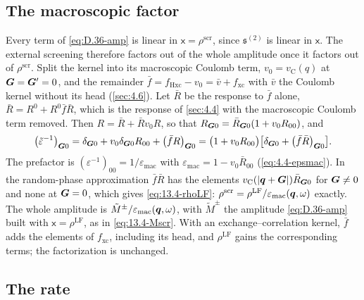 \subsection*{The macroscopic factor}

Every term of \cref{eq:D.36-amp} is linear in $\mathsf{x} = \rho^{\mathrm{scr}}$, since $\mathfrak{s}^{(2)}$ is linear in $\mathsf{x}$. The external screening therefore factors out of the whole amplitude once it factors out of $\rho^{\mathrm{scr}}$. Split the kernel into its macroscopic Coulomb term, $v_0 = v_{\mathrm{C}}(q)$ at $\bm{G} = \bm{G}' = 0$, and the remainder $\bar f = f_{\mathrm{Hxc}} - v_0 = \bar v + f_{\mathrm{xc}}$ with $\bar v$ the Coulomb kernel without its head (\cref{sec:4.6}). Let $\bar R$ be the response to $\bar f$ alone, $\bar R = R^0 + R^0\bar f\bar R$, which is the response of \cref{sec:4.4} with the macroscopic Coulomb term removed. Then $R = \bar R + \bar Rv_0R$, so that $R_{\bm{G}0} = \bar R_{\bm{G}0}(1 + v_0R_{00})$, and
\begin{equation*}
  \bigl(\tilde\varepsilon^{-1}\bigr)_{\bm{G}0} = \delta_{\bm{G}0} + v_0\delta_{\bm{G}0}R_{00} + \bigl(\bar fR\bigr)_{\bm{G}0} = \bigl(1 + v_0R_{00}\bigr)\bigl[\delta_{\bm{G}0} + \bigl(\bar f\bar R\bigr)_{\bm{G}0}\bigr] .
\end{equation*}
The prefactor is $(\varepsilon^{-1})_{00} = 1/\varepsilon_{\mathrm{mac}}$ with $\varepsilon_{\mathrm{mac}} = 1 - v_0\bar R_{00}$ (\cref{eq:4.4-epsmac}). In the random-phase approximation $\bar f\bar R$ has the elements $v_{\mathrm{C}}(|\bm{q}+\bm{G}|)\bar R_{\bm{G}0}$ for $\bm{G} \ne 0$ and none at $\bm{G} = 0$, which gives \cref{eq:13.4-rhoLF}: $\rho^{\mathrm{scr}} = \rho^{\mathrm{LF}}/\varepsilon_{\mathrm{mac}}(\bm{q},\omega)$ exactly. The whole amplitude is $\tilde M^\pm/\varepsilon_{\mathrm{mac}}(\bm{q},\omega)$, with $\tilde M^\pm$ the amplitude \cref{eq:D.36-amp} built with $\mathsf{x} = \rho^{\mathrm{LF}}$, as in \cref{eq:13.4-Mscr}. With an exchange--correlation kernel, $\bar f$ adds the elements of $f_{\mathrm{xc}}$, including its head, and $\rho^{\mathrm{LF}}$ gains the corresponding terms; the factorization is unchanged.

\subsection*{The rate}


